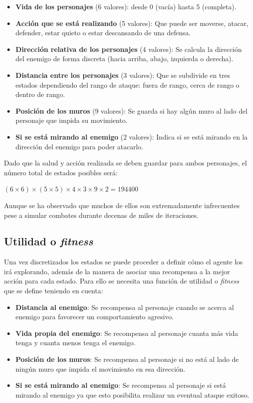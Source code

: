 \begin{itemize}
	\item \textbf{Vida de los personajes} (6 valores): desde 0 (vacía) hasta 5 (completa).
	\item \textbf{Acción que se está realizando} (5 valores): Que puede ser moverse, atacar, defender, estar quieto o estar descansando de una defensa.
	\item \textbf{Dirección relativa de los personajes} (4 valores): Se calcula la dirección del enemigo de forma discreta (hacia arriba, abajo, izquierda o derecha).
	\item \textbf{Distancia entre los personajes} (3 valores): Que se subdivide en tres estados dependiendo del rango de ataque: fuera de rango, cerca de rango o dentro de rango.
	\item \textbf{Posición de los muros} (9 valores): Se guarda si hay algún muro al lado del personaje que impida su movimiento.
	\item \textbf{Si se está mirando al enemigo} (2 valores): Indica si se está mirando en la dirección del enemigo para poder atacarlo.
\end{itemize}

Dado que la salud y acción realizada se deben guardar para ambos personajes, el número total de estados posibles será:
\bigskip

$(6\times6)\times(5\times5)\times4\times3\times9\times2=194400$

Aunque se ha observado que muchos de ellos son extremadamente infrecuentes pese a simular combates durante decenas de miles de iteraciones.



\subsection{Utilidad o \textit{fitness}}

Una vez discretizados los estados se puede proceder a definir cómo el agente los irá explorando, además de la manera de asociar una recompensa a la mejor acción para cada estado. Para ello se necesita una función de utilidad o \textit{fitness} que se define teniendo en cuenta:

\begin{itemize}
	\item \textbf{Distancia al enemigo}: Se recompensa al personaje cuando se acerca al enemigo para favorecer un comportamiento agresivo.
	\item \textbf{Vida propia del enemigo}: Se recompensa al personaje cuanta más vida tenga y cuanta menos tenga el enemigo.
	\item \textbf{Posición de los muros}: Se recompensa al personaje si no está al lado de ningún muro que impida el movimiento en esa dirección.
	\item \textbf{Si se está mirando al enemigo}: Se recompensa al personaje si está mirando al enemigo ya que esto posibilita realizar un eventual ataque exitoso.
\end{itemize}

